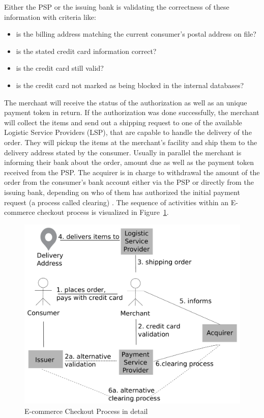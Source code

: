 Either the \gls{PSP} or the issuing bank is validating the correctness of these information with criteria like: \@

\begin{itemize}
    \item is the billing address matching the current consumer's postal address on file?
    \item is the stated credit card information correct?
    \item is the credit card still valid?
    \item is the credit card not marked as being blocked in the internal databases?
\end{itemize}

The merchant will receive the status of the authorization as well as an unique payment token in return. If the authorization was done successfully, the merchant will collect the items and send out a shipping request to one of the available Logistic Service Providers (\gls{LSP}), that are capable to handle the delivery of the order. They will pickup the items at the merchant's facility and ship them to the delivery address stated by the consumer. Usually in parallel the merchant is informing their bank about the order, amount due as well as the payment token received from the \gls{PSP}. The acquirer is in charge to withdrawal the amount of the order from the consumer's bank account either via the \gls{PSP} or directly from the issuing bank, depending on who of them has authorized the initial payment request (a process called clearing) \citep{VisaPayment2014}. The sequence of activities within an \gls{E-commerce} checkout process is visualized in Figure~\ref{fig:images_ecommerce_checkout_process}.\@

\begin{figure}[!ht]
	\centering
		\includegraphics[width=0.9\columnwidth]{images/e-commerce-checkout-process.pdf}
	\caption{\gls{E-commerce} Checkout Process in detail}
\label{fig:images_ecommerce_checkout_process}
\end{figure}

